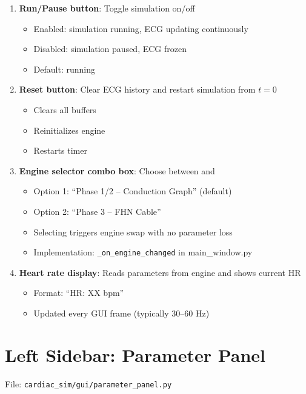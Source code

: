 \documentclass[12pt,a4paper,oneside]{book}
\begin{document}
\begin{enumerate}
    \item \textbf{Run/Pause button}: Toggle simulation on/off
    \begin{itemize}
        \item Enabled: simulation running, ECG updating continuously
        \item Disabled: simulation paused, ECG frozen
        \item Default: running
    \end{itemize}
    
    \item \textbf{Reset button}: Clear ECG history and restart simulation from $t=0$
    \begin{itemize}
        \item Clears all buffers
        \item Reinitializes engine
        \item Restarts timer
    \end{itemize}
    
    \item \textbf{Engine selector combo box}: Choose between \phaseI and \phaseIII
    \begin{itemize}
        \item Option 1: ``Phase 1/2 – Conduction Graph'' (default)
        \item Option 2: ``Phase 3 – FHN Cable''
        \item Selecting triggers engine swap with no parameter loss
        \item Implementation: \texttt{\_on\_engine\_changed} in main\_window.py
    \end{itemize}
    
    \item \textbf{Heart rate display}: Reads parameters from engine and shows current HR
    \begin{itemize}
        \item Format: ``HR: XX bpm''
        \item Updated every GUI frame (typically 30--60 Hz)
    \end{itemize}
\end{enumerate}

\section{Left Sidebar: Parameter Panel}

File: \texttt{cardiac\_sim/gui/parameter\_panel.py}
\end{document}
